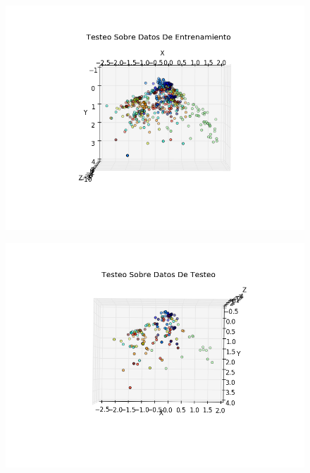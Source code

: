 \begin{figure}[h!]
\hspace{-2cm}\begin{minipage}{.7\textwidth}
  \centering
  \includegraphics[width=.9\linewidth]{testeo_test_set_oja/entrenamiento12.png}
  \label{fig:test1}
\end{minipage}%
\hspace{-3cm}
\begin{minipage}{.7\textwidth}
  \centering
  \includegraphics[width=.9\linewidth]{testeo_test_set_oja/test_12.png}
  \label{fig:test2}
\end{minipage}
\end{figure}


